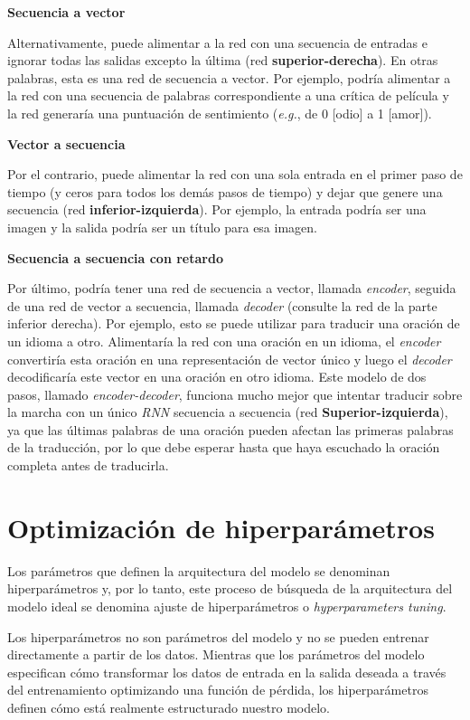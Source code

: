 \documentclass[a4paper,12pt]{article}
\begin{document}
\textbf{Secuencia a vector}

Alternativamente, puede alimentar a la red con una secuencia de entradas e ignorar todas las salidas excepto la última (red \textbf{superior-derecha}). En otras palabras, esta es una red de secuencia a vector. Por ejemplo, podría alimentar a la red con una secuencia de palabras correspondiente a una crítica de película y la red generaría una puntuación de sentimiento (\textit{e.g.}, de 0 [odio] a 1 [amor]).

\textbf{Vector a secuencia}

Por el contrario, puede alimentar la red con una sola entrada en el primer paso de tiempo (y ceros para todos los demás pasos de tiempo) y dejar que genere una secuencia (red \textbf{inferior-izquierda}). Por ejemplo, la entrada podría ser una imagen y la salida podría ser un título para esa imagen.

\textbf{Secuencia a secuencia con retardo}

Por último, podría tener una red de secuencia a vector, llamada \textit{encoder}, seguida de una red de vector a secuencia, llamada \textit{decoder} (consulte la red de la parte inferior derecha). Por ejemplo, esto se puede utilizar para traducir una oración de un idioma a otro. Alimentaría la red con una oración en un idioma, el \textit{encoder} convertiría esta oración en una representación de vector único y luego el \textit{decoder} decodificaría este vector en una oración en otro idioma. Este modelo de dos pasos, llamado \textit{encoder-decoder}, funciona mucho mejor que intentar traducir sobre la marcha con un único \textit{RNN} secuencia a secuencia (red \textbf{Superior-izquierda}), ya que las últimas palabras de una oración pueden afectan las primeras palabras de la traducción, por lo que debe esperar hasta que haya escuchado la oración completa antes de traducirla.

\section{Optimización de hiperparámetros} \label{tuning-hp}
Los parámetros que definen la arquitectura del modelo se denominan hiperparámetros y, por lo tanto, este proceso de búsqueda de la arquitectura del modelo ideal se denomina ajuste de hiperparámetros o \textit{hyperparameters tuning}. \citep{Koehrsen2018Jul}

Los hiperparámetros no son parámetros del modelo y no se pueden entrenar directamente a partir de los datos. Mientras que los parámetros del modelo especifican cómo transformar los datos de entrada en la salida deseada a través del entrenamiento optimizando una función de pérdida, los hiperparámetros definen cómo está realmente estructurado nuestro modelo.
\end{document}
